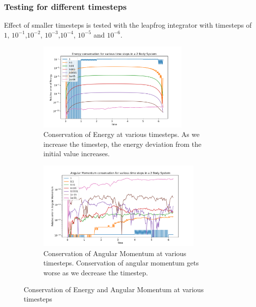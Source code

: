 \documentclass[12pt,a4paper]{article}
\begin{document}
\subsubsection{Testing for different timesteps}
Effect of smaller timesteps is tested with the leapfrog integrator with timesteps of $1$, $10^{-1}$,$10^{-2}$, $10^{-3}$,$10^{-4}$, $10^{-5}$ and $10^{-6}$.\\
\begin{figure}[H]
  \centering
  \begin{subfigure}{0.49\textwidth}
    \includegraphics[height = 1.7in]{2Body/2Body_Energy_Consv_dt.png}
    \caption{Conservation of Energy at various timesteps. As we increase the timestep, the energy deviation from the initial value increases.}
    \label{fig:dt_e}  
  \end{subfigure}
  \begin{subfigure}{0.49\textwidth}
    \includegraphics[height = 1.7in]{2Body/2Body_L_Consv_dt.png}
    \caption{Conservation of Angular Momentum at various timesteps. Conservation of angular momentum gets worse as we decrease the timestep.}
    \label{fig:dt_L}  
  \end{subfigure}
  \caption{Conservation of Energy and Angular Momentum at various timesteps}
\end{figure}
\end{document}
